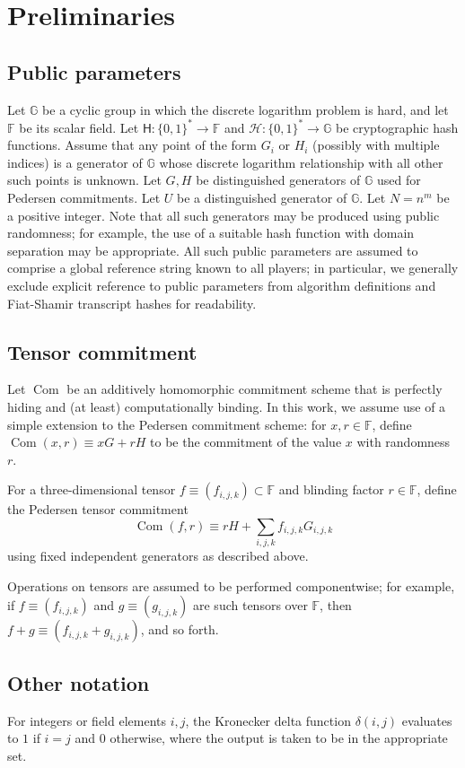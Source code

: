 \documentclass{article}
\newcommand{\G}{\mathbb{G}}
\newcommand{\F}{\mathbb{F}}
\newcommand{\hs}{\mathsf{H}}
\newcommand{\hp}{\mathcal{H}}
\newcommand{\com}{\operatorname{Com}}
\theoremstyle{definition}
\begin{document}
\section{Preliminaries}
\subsection{Public parameters}
Let $\G$ be a cyclic group in which the discrete logarithm problem is hard, and let $\F$ be its scalar field.
Let $\hs: \{0,1\}^* \to \F$ and $\hp: \{0,1\}^* \to \G$ be cryptographic hash functions.
Assume that any point of the form $G_i$ or $H_i$ (possibly with multiple indices) is a generator of $\G$ whose discrete logarithm relationship with all other such points is unknown.
Let $G, H$ be distinguished generators of $\G$ used for Pedersen commitments.
Let $U$ be a distinguished generator of $\G$.
Let $N = n^m$ be a positive integer.
Note that all such generators may be produced using public randomness; for example, the use of a suitable hash function with domain separation may be appropriate.
All such public parameters are assumed to comprise a global reference string known to all players; in particular, we generally exclude explicit reference to public parameters from algorithm definitions and Fiat-Shamir transcript hashes for readability.


\subsection{Tensor commitment}
Let $\com$ be an additively homomorphic commitment scheme that is perfectly hiding and (at least) computationally binding.
In this work, we assume use of a simple extension to the Pedersen commitment scheme: for $x,r \in \F$, define $\com(x,r) \equiv xG + rH$ to be the commitment of the value $x$ with randomness $r$.

For a three-dimensional tensor $f \equiv (f_{i,j,k}) \subset \F$ and blinding factor $r \in \F$, define the Pedersen tensor commitment
$$\com(f,r) \equiv rH + \sum_{i,j,k} f_{i,j,k} G_{i,j,k}$$
using fixed independent generators as described above.

Operations on tensors are assumed to be performed componentwise; for example, if $f \equiv (f_{i,j,k})$ and $g \equiv (g_{i,j,k})$ are such tensors over $\F$, then $f + g \equiv (f_{i,j,k} + g_{i,j,k})$, and so forth.


\subsection{Other notation}
For integers or field elements $i,j$, the Kronecker delta function $\delta(i,j)$ evaluates to $1$ if $i=j$ and $0$ otherwise, where the output is taken to be in the appropriate set.
\end{document}
